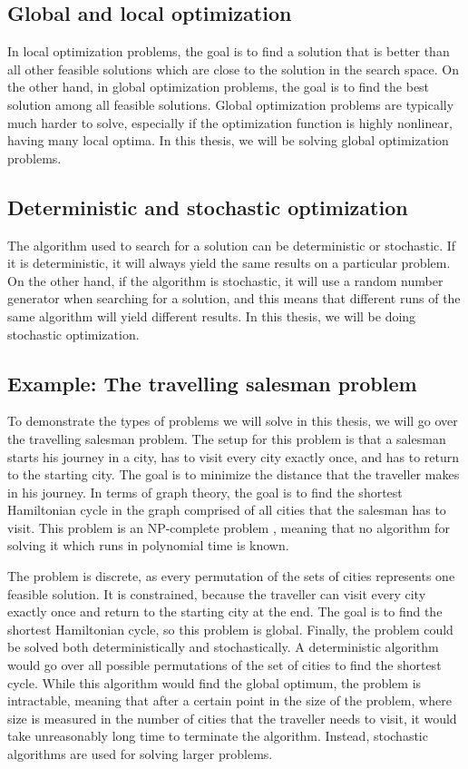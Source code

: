 \subsection{Global and local optimization}
\label{sec:global_and_local_optimization}
In local optimization problems, the goal is to find a solution that is better than all other feasible solutions which are close to the solution in the search space. On the other hand, in global optimization problems, the goal is to find the best solution among all feasible solutions. Global optimization problems are typically much harder to solve, especially if the optimization function is highly nonlinear, having many local optima. In this thesis, we will be solving global optimization problems.

\subsection{Deterministic and stochastic optimization}
\label{sec:deterministic_and_stochastic_optimization}
The algorithm used to search for a solution can be deterministic or stochastic. If it is deterministic, it will always yield the same results on a particular problem. On the other hand, if the algorithm is stochastic, it will use a random number generator when searching for a solution, and this means that different runs of the same algorithm will yield different results. In this thesis, we will be doing stochastic optimization.

\subsection{Example: The travelling salesman problem}
\label{sec:the_travelling_salesman_problem}
To demonstrate the types of problems we will solve in this thesis, we will go over the travelling salesman problem. The setup for this problem is that a salesman starts his journey in a city, has to visit every city exactly once, and has to return to the starting city. The goal is to minimize the distance that the traveller makes in his journey. In terms of graph theory, the goal is to find the shortest Hamiltonian cycle in the graph comprised of all cities that the salesman has to visit. This problem is an NP-complete problem \citep{sipser2012computation}, meaning that no algorithm for solving it which runs in polynomial time is known.

The problem is discrete, as every permutation of the sets of cities represents one feasible solution. It is constrained, because the traveller can visit every city exactly once and return to the starting city at the end. The goal is to find the shortest Hamiltonian cycle, so this problem is global. Finally, the problem could be solved both deterministically and stochastically. A deterministic algorithm would go over all possible permutations of the set of cities to find the shortest cycle. While this algorithm would find the global optimum, the problem is intractable, meaning that after a certain point in the size of the problem, where size is measured in the number of cities that the traveller needs to visit, it would take unreasonably long time to terminate the algorithm. Instead, stochastic algorithms are used for solving larger problems.

